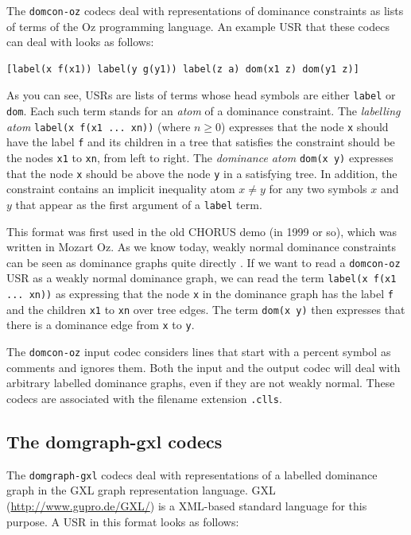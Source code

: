 The \verb?domcon-oz? codecs deal with representations of dominance
constraints \cite{clls2000} as lists of terms of the Oz programming
language. An example USR that these codecs can deal with looks as
follows:

\begin{verbatim}
[label(x f(x1)) label(y g(y1)) label(z a) dom(x1 z) dom(y1 z)]
\end{verbatim}

As you can see, USRs are lists of terms whose head symbols are either
\verb?label? or \verb?dom?. Each such term stands for an \emph{atom}
of a dominance constraint. The \emph{labelling atom}
\verb?label(x f(x1 ... xn))?  (where $n \geq 0$) expresses that the
node \verb?x? should have the label \verb?f? and its children in a
tree that satisfies the constraint should be the nodes \verb?x1? to
\verb?xn?, from left to right. The \emph{dominance atom}
\verb?dom(x y)? expresses that the node \verb?x? should be above the
node \verb?y? in a satisfying tree. In addition, the constraint
contains an implicit inequality atom $x \neq y$ for any two symbols
$x$ and $y$ that appear as the first argument of a \verb?label? term.

This format was first used in the old CHORUS demo (in 1999 or so),
which was written in Mozart Oz. As we know today, weakly normal
dominance constraints can be seen as dominance graphs quite directly
\cite{Koller04}. If we want to read a \verb?domcon-oz?  USR as a
weakly normal dominance graph, we can read the term
\verb?label(x f(x1 ... xn))? as expressing that the node \verb?x? in
the dominance graph has the label \verb?f? and the children \verb?x1?
to \verb?xn? over tree edges. The term \verb?dom(x y)? then expresses
that there is a dominance edge from \verb?x? to \verb?y?. 

The \verb?domcon-oz? input codec considers lines that start with a
percent symbol as comments and ignores them. Both the input and the
output codec will deal with arbitrary labelled dominance graphs, even
if they are not weakly normal. These codecs are associated with the
filename extension \verb?.clls?.



\subsection{The domgraph-gxl codecs}

The \verb?domgraph-gxl? codecs deal with representations of a labelled
dominance graph in the GXL graph representation language. GXL
(\url{http://www.gupro.de/GXL/}) is a XML-based standard language for
this purpose. A USR in this format looks as follows:

